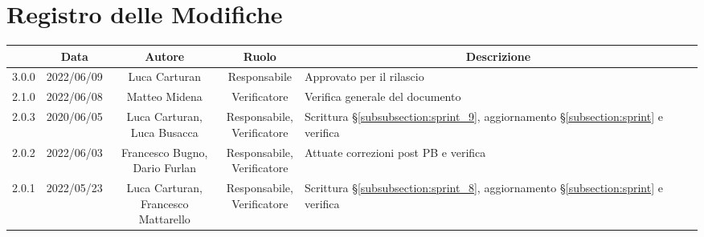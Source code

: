 \thispagestyle{empty}
\section*{Registro delle Modifiche}

\begin{center}
	\renewcommand{\arraystretch}{1.8}
	\begin{longtable}[c]{c | c | c | c | p{5cm}}
		\rowcolor[HTML]{125E28}
		\multicolumn{1}{c}{\color[HTML]{FFFFFF} \textbf{Versione}} &
		\multicolumn{1}{c}{\color[HTML]{FFFFFF} \textbf{Data}}     &
		\multicolumn{1}{c}{\color[HTML]{FFFFFF} \textbf{Autore}}   &
		\multicolumn{1}{c}{\color[HTML]{FFFFFF} \textbf{Ruolo}}    &
		\multicolumn{1}{c}{\color[HTML]{FFFFFF} \textbf{Descrizione}}                                                                                                                                                                                                                 \\
		\endhead
		3.0.0                                                      & 2022/06/09 & Luca Carturan                          & Responsabile   & Approvato per il rilascio \\
		2.1.0                                                      & 2022/06/08 & Matteo Midena                                                        & Verificatore                                   & Verifica generale del documento\\
		2.0.3													   & 2020/06/05 & \Shortunderstack{Luca Carturan, \\Luca Busacca}                      & \Shortunderstack{Responsabile,\\ Verificatore}   & Scrittura §\ref{subsubsection:sprint_9}, aggiornamento §\ref{subsection:sprint} e verifica\\
		2.0.2 													   & 2022/06/03& \Shortunderstack{Francesco Bugno,\\ Dario Furlan} &  \Shortunderstack{Responsabile, \\ Verificatore}   & Attuate correzioni post PB e verifica \\
		2.0.1                                                      & 2022/05/23 & \Shortunderstack{Luca Carturan,                                                                                                                                                                   \\Francesco Mattarello} & \Shortunderstack{Responsabile,\\Verificatore} & Scrittura §\ref{subsubsection:sprint_8}, aggiornamento §\ref{subsection:sprint} e verifica\\

\end{longtable}
\end{center}
